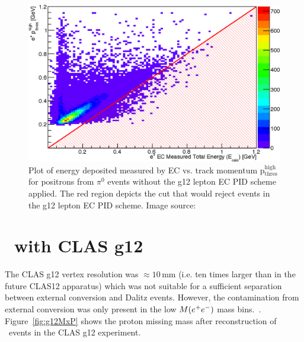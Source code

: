 \begin{figure}\begin{center}
											\includegraphics[width=0.8\figwidth]{figures/lepton/Pip_EChighcut.eps}
											\caption[EC Deposited Energy Comparison to Track Momentum for $e^+$ from $\pi^0$ Events]{\label{fig:islep.pipECcut}Plot of energy deposited measured by EC vs. track momentum p$\mathrm{_{thres}^{high}}$ for positrons from $\pi^0$ events without the g12 lepton EC PID scheme applied. The red region depicts the cut that would reject events in the g12 lepton EC PID scheme. Image source:~\cite{thesiskunkel}}
\end{center}\end{figure}																											
\FloatBarrier
\section{\etaPDal \  with CLAS g12}
The CLAS g12 vertex resolution was $\approx 10\,\mathrm{mm}$ (i.e. ten times larger than in the future CLAS12 apparatus) which was not suitable for a sufficient separation between external conversion and Dalitz events. However, the contamination from external conversion was only present in the low $M(e^+e^-)$ mass bins.~\cite{thesisschever}.	Figure~\ref{fig:g12MxP} shows the proton missing mass after reconstruction of  \etaPDal \  events in the CLAS g12 experiment.

